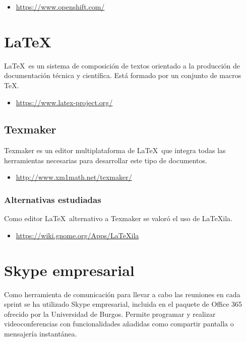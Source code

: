 \begin{itemize}
	\item \url{https://www.openshift.com/}
\end{itemize}


\section{LaTeX}

\LaTeX\ es un sistema de composición de textos orientado a la producción de documentación técnica y científica. Está formado por un conjunto de macros \TeX.

\begin{itemize}
	\item \url{https://www.latex-project.org/}
\end{itemize}

\subsection{Texmaker}

Texmaker es un editor multiplataforma de \LaTeX\ que integra todas las herramientas necesarias para desarrollar este tipo de documentos.

\begin{itemize}
	\item \url{http://www.xm1math.net/texmaker/}
\end{itemize}

\subsubsection{Alternativas estudiadas}

Como editor \LaTeX\ alternativo a Texmaker se valoró el uso de LaTeXila.

\begin{itemize}
	\item \url{https://wiki.gnome.org/Apps/LaTeXila}
\end{itemize}

\section{Skype empresarial}

Como herramienta de comunicación para llevar a cabo las reuniones en cada sprint se ha utilizado Skype empresarial, incluida en el paquete de Office 365 ofrecido por la Universidad de Burgos. Permite programar y realizar videoconferencias con funcionalidades añadidas como compartir pantalla o mensajería instantánea.

